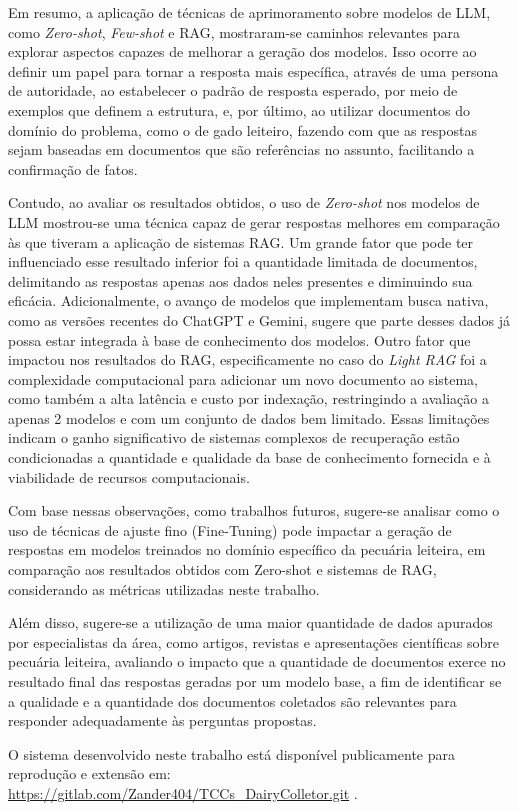 Em resumo, a aplicação de técnicas de aprimoramento sobre modelos de LLM, como \textit{Zero-shot}, \textit{Few-shot} e RAG, mostraram-se caminhos relevantes para explorar aspectos capazes de melhorar a geração dos modelos. Isso ocorre ao definir um papel para tornar a resposta mais específica, através de uma persona de autoridade, ao estabelecer o padrão de resposta esperado, por meio de exemplos que definem a estrutura, e, por último, ao utilizar documentos do domínio do problema, como o de gado leiteiro, fazendo com que as respostas sejam baseadas em documentos que são referências no assunto, facilitando a confirmação de fatos.

Contudo, ao avaliar os resultados obtidos, o uso de \textit{Zero-shot} nos modelos de LLM mostrou-se uma técnica capaz de gerar respostas melhores em comparação às que tiveram a aplicação de sistemas RAG. Um grande fator que pode ter influenciado esse resultado inferior foi a quantidade limitada de documentos, delimitando as respostas apenas aos dados neles presentes e diminuindo sua eficácia. Adicionalmente, o avanço de modelos que implementam busca nativa, como as versões recentes do ChatGPT e Gemini, sugere que parte desses dados já possa estar integrada à base de conhecimento dos modelos. Outro fator que impactou nos resultados do RAG, especificamente no caso do \textit{Light RAG} foi a complexidade computacional para adicionar um novo documento ao sistema, como também a alta latência e custo por indexação, restringindo a avaliação a apenas 2 modelos e com um conjunto de dados bem limitado. Essas limitações indicam o ganho significativo de sistemas complexos de recuperação estão condicionadas a quantidade e qualidade da base de conhecimento fornecida e à viabilidade de recursos computacionais.

Com base nessas observações, como trabalhos futuros, sugere-se analisar como o uso de técnicas de ajuste fino (Fine-Tuning) pode impactar a geração de respostas em modelos treinados no domínio específico da pecuária leiteira, em comparação aos resultados obtidos com Zero-shot e sistemas de RAG, considerando as métricas utilizadas neste trabalho.

Além disso, sugere-se a utilização de uma maior quantidade de dados apurados por especialistas da área, como artigos, revistas e apresentações científicas sobre pecuária leiteira, avaliando o impacto que a quantidade de documentos exerce no resultado final das respostas geradas por um modelo base, a fim de identificar se a qualidade e a quantidade dos documentos coletados são relevantes para responder adequadamente às perguntas propostas.

O sistema desenvolvido neste trabalho está disponível publicamente para reprodução e extensão em: \url{https://gitlab.com/Zander404/TCCs_DairyColletor.git}
.


